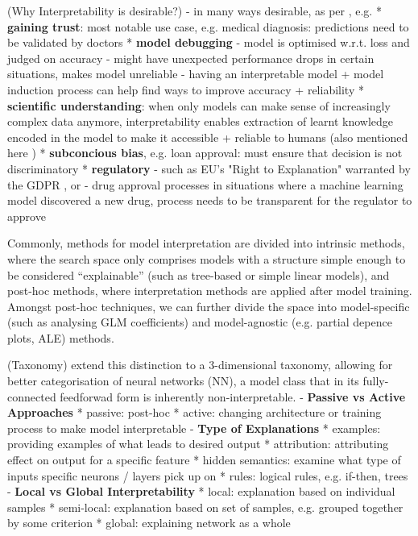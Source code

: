 \documentclass[twoside,11pt]{article}
\begin{document}
(Why Interpretability is desirable?)
- in many ways desirable, as per \citet[pp. 3-4]{Zach2019InterpretabilityOD}, e.g.
  * \textbf{gaining trust}: most notable use case, e.g. medical diagnosis: predictions need to be validated by doctors \citep[p. 1]{review_NN_interpretability}
  * \textbf{model debugging}
    - model is optimised w.r.t. loss and judged on accuracy
    - might have unexpected performance drops in certain situations, makes model unreliable \citep[1B]{survey_NN_interpretability}
    - having an interpretable model + model induction process can help find ways to improve accuracy + reliability
  * \textbf{scientific understanding}: when only models can make sense of increasingly complex data anymore, interpretability enables extraction of learnt knowledge encoded
    in the model to make it accessible + reliable to humans (also mentioned here \citep[p. 1]{review_NN_interpretability})
  * \textbf{subconcious bias}, e.g. loan approval: must ensure that decision is not discriminatory
  * \textbf{regulatory}
    - such as EU's "Right to Explanation" warranted by the GDPR \citep[p. 1]{review_NN_interpretability}, \citep[1B]{survey_NN_interpretability} or
    - drug approval processes in situations where a machine learning model discovered a new drug, process needs to be transparent for the regulator to approve \citep[1B]{survey_NN_interpretability}

Commonly, methods for model interpretation are divided into intrinsic methods, where the search space only comprises models with a structure simple enough to be
considered ``explainable'' (such as tree-based or simple linear models), and post-hoc methods, where interpretation methods are applied after model training.
Amongst post-hoc techniques, we can further divide the space into model-specific (such as analysing GLM coefficients) and model-agnostic
(e.g. partial depence plots, ALE) methods. \citet[chap. 3.2]{molnar2022}

(Taxonomy)
\citet[chap. 2]{survey_NN_interpretability} extend this distinction to a 3-dimensional taxonomy, allowing for better categorisation of neural networks (NN), a model class
that in its fully-connected feedforwad form is inherently non-interpretable.
- \textbf{Passive vs Active Approaches}
  * passive: post-hoc
  * active: changing architecture or training process to make model interpretable
- \textbf{Type of Explanations}
  * examples: providing examples of what leads to desired output
  * attribution: attributing effect on output for a specific feature
  * hidden semantics: examine what type of inputs specific neurons / layers pick up on
  * rules: logical rules, e.g. if-then, trees
- \textbf{Local vs Global Interpretability}
  * local: explanation based on individual samples
  * semi-local: explanation based on set of samples, e.g. grouped together by some criterion
  * global: explaining network as a whole
\end{document}
